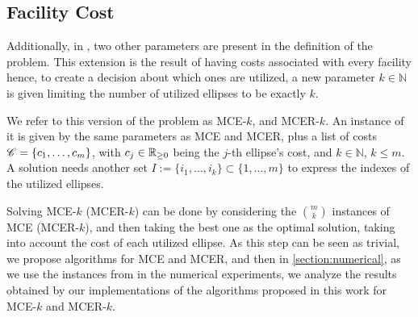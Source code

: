 \subsection{Facility Cost}

Additionally, in \cite{canbolat, andreta}, two other parameters are present in the definition of the problem. This extension is the result of having costs associated with every facility hence, to create a decision about which ones are utilized, a new parameter $k\in\mathbb{N}$ is given limiting the number of utilized ellipses to be exactly $k$.

We refer to this version of the problem as  MCE-$k$, and MCER-$k$. An instance of it is given by the same parameters as MCE and MCER, plus a list of costs $\mathscr{C}=\{c_1, \dots, c_m\}$, with $c_j\in\mathbb{R}_{\ge0}$ being the $j$-th ellipse's cost, and $k\in\mathbb{N}$, $k\le m$.
A solution needs another set $I:=\{i_1, \dots, i_k\}\subset\{1, \dots, m\}$ to express the indexes of the utilized ellipses.

Solving MCE-$k$ (MCER-$k$) can be done by considering the $\binom{m}{k}$ instances of MCE (MCER-$k$), and then taking the best one as the optimal solution, taking into account the cost of each utilized ellipse. 
As this step can be seen as trivial, we propose algorithms for MCE and MCER, and then in \autoref{section:numerical}, as we use the instances from \cite{canbolat, andreta} in the numerical experiments, we analyze the results obtained by our implementations of the algorithms proposed in this work for MCE-$k$ and MCER-$k$.
